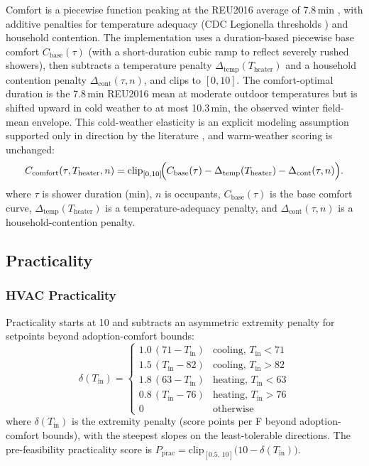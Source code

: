 \documentclass[final,3p,times]{elsarticle}
\begin{document}
Comfort is a piecewise function peaking at the REU2016 average of 7.8\,min \cite{reu2016,harrispoll2024}, with additive penalties for temperature adequacy (CDC Legionella thresholds \cite{cdc2026}) and household contention.
The implementation uses a duration-based piecewise base comfort $C_{\mathrm{base}}(\tau)$ (with a short-duration cubic ramp to reflect severely rushed showers), then subtracts a temperature penalty $\Delta_{\mathrm{temp}}(T_{\mathrm{heater}})$ and a household contention penalty $\Delta_{\mathrm{cont}}(\tau,n)$, and clips to $[0,10]$. The comfort-optimal duration is the 7.8\,min REU2016 mean at moderate outdoor temperatures but is shifted upward in cold weather to at most 10.3\,min, the observed winter field-mean envelope. This cold-weather elasticity is an explicit modeling assumption supported only in direction by the literature \cite{wong2022,reu2016}, and warm-weather scoring is unchanged:
\begin{equation}
  C_{\mathrm{comfort}}(\tau,T_{\mathrm{heater}},n)
  = \mathrm{clip}_{[0,10]}\!\Bigl(C_{\mathrm{base}}(\tau)
  -\Delta_{\mathrm{temp}}(T_{\mathrm{heater}})
  -\Delta_{\mathrm{cont}}(\tau,n)\Bigr).
  \label{eq:shower_comfort_full}
\end{equation}
\noindent where $\tau$ is shower duration (min), $n$ is occupants, $C_{\mathrm{base}}(\tau)$ is the base comfort curve, $\Delta_{\mathrm{temp}}(T_{\mathrm{heater}})$ is a temperature-adequacy penalty, and $\Delta_{\mathrm{cont}}(\tau,n)$ is a household-contention penalty.

\subsection{Practicality}

\subsubsection{HVAC Practicality}

Practicality starts at 10 and subtracts an asymmetric extremity penalty for setpoints beyond adoption-comfort bounds:
\begin{equation}
  \delta(T_{\mathrm{in}}) =
  \begin{cases}
    1.0\,(71 - T_{\mathrm{in}}) & \text{cooling, } T_{\mathrm{in}} < 71 \\[3pt]
    1.5\,(T_{\mathrm{in}} - 82) & \text{cooling, } T_{\mathrm{in}} > 82 \\[3pt]
    1.8\,(63 - T_{\mathrm{in}}) & \text{heating, } T_{\mathrm{in}} < 63 \\[3pt]
    0.8\,(T_{\mathrm{in}} - 76) & \text{heating, } T_{\mathrm{in}} > 76 \\[3pt]
    0                             & \text{otherwise}
  \end{cases}
  \label{eq:hvac_practicality}
\end{equation}
\noindent where $\delta(T_{\mathrm{in}})$ is the extremity penalty (score points per \textdegree{}F beyond adoption-comfort bounds), with the steepest slopes on the least-tolerable directions. The pre-feasibility practicality score is $P_{\mathrm{prac}} = \mathrm{clip}_{[0.5,\,10]}\!\bigl(10 - \delta(T_{\mathrm{in}})\bigr)$.
\end{document}
